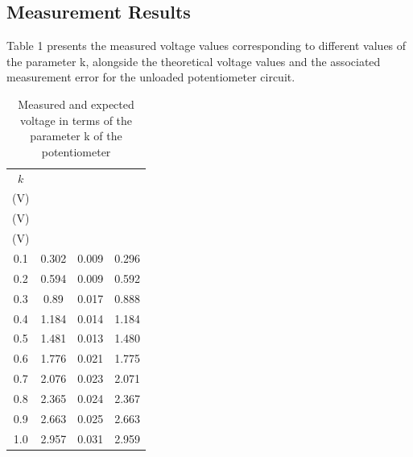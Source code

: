 \documentclass[a4paper]{article}
\begin{document}
\subsection{Measurement Results}
Table 1 presents the measured voltage values corresponding to different values of 
the parameter k, alongside the theoretical voltage values and 
the associated measurement error for the unloaded potentiometer circuit.
\begin{table}[!ht]
    \centering
    \label{tab:1}
    \caption{Measured and expected voltage in terms of the parameter k of the potentiometer}
    \begin{tabular}{|c| c| c| c|} 
    \hline
    $k$ & \makecell{$V_{unloaded}$ \\ (V)} & \makecell{$\Delta V_{unloaded}$ \\ (V)} &
    \makecell{$V_{expected}$ \\ (V)}  \\ 
    \hline
    0.1                                       & 0.302      &  0.009          & 0.296      \\
    0.2                                       & 0.594      &   0.009         & 0.592      \\
    0.3                                       & 0.89       &   0.017         & 0.888      \\
    0.4                                       & 1.184      &  0.014          & 1.184      \\
    0.5                                       & 1.481      &  0.013          & 1.480      \\
    0.6                                       & 1.776      &  0.021          & 1.775      \\
    0.7                                       & 2.076      &  0.023          & 2.071      \\
    0.8                                       & 2.365      &  0.024          & 2.367      \\
    0.9                                       & 2.663      &  0.025          & 2.663      \\
    1.0                                       & 2.957      &  0.031          & 2.959      \\
    \hline
    \end{tabular}
    \end{table}
\newpage
\end{document}
